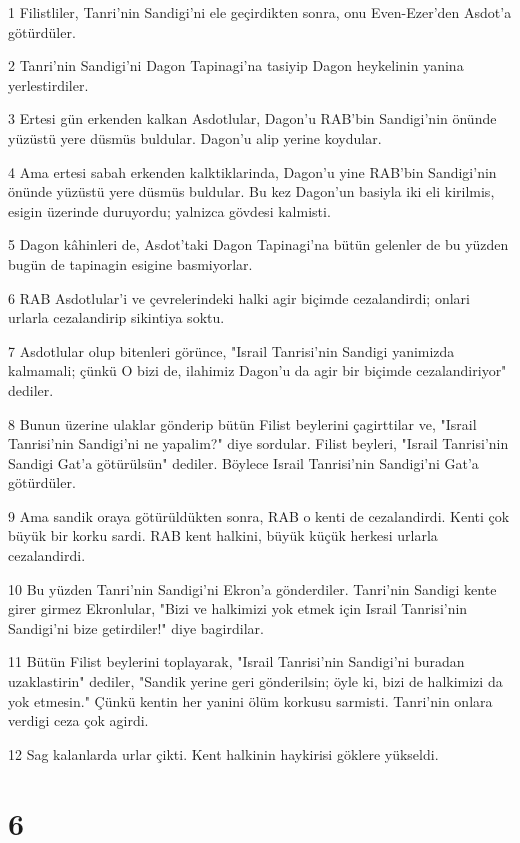 \par 1 Filistliler, Tanri'nin Sandigi'ni ele geçirdikten sonra, onu Even-Ezer'den Asdot'a götürdüler.
\par 2 Tanri'nin Sandigi'ni Dagon Tapinagi'na tasiyip Dagon heykelinin yanina yerlestirdiler.
\par 3 Ertesi gün erkenden kalkan Asdotlular, Dagon'u RAB'bin Sandigi'nin önünde yüzüstü yere düsmüs buldular. Dagon'u alip yerine koydular.
\par 4 Ama ertesi sabah erkenden kalktiklarinda, Dagon'u yine RAB'bin Sandigi'nin önünde yüzüstü yere düsmüs buldular. Bu kez Dagon'un basiyla iki eli kirilmis, esigin üzerinde duruyordu; yalnizca gövdesi kalmisti.
\par 5 Dagon kâhinleri de, Asdot'taki Dagon Tapinagi'na bütün gelenler de bu yüzden bugün de tapinagin esigine basmiyorlar.
\par 6 RAB Asdotlular'i ve çevrelerindeki halki agir biçimde cezalandirdi; onlari urlarla cezalandirip sikintiya soktu.
\par 7 Asdotlular olup bitenleri görünce, "Israil Tanrisi'nin Sandigi yanimizda kalmamali; çünkü O bizi de, ilahimiz Dagon'u da agir bir biçimde cezalandiriyor" dediler.
\par 8 Bunun üzerine ulaklar gönderip bütün Filist beylerini çagirttilar ve, "Israil Tanrisi'nin Sandigi'ni ne yapalim?" diye sordular. Filist beyleri, "Israil Tanrisi'nin Sandigi Gat'a götürülsün" dediler. Böylece Israil Tanrisi'nin Sandigi'ni Gat'a götürdüler.
\par 9 Ama sandik oraya götürüldükten sonra, RAB o kenti de cezalandirdi. Kenti çok büyük bir korku sardi. RAB kent halkini, büyük küçük herkesi urlarla cezalandirdi.
\par 10 Bu yüzden Tanri'nin Sandigi'ni Ekron'a gönderdiler. Tanri'nin Sandigi kente girer girmez Ekronlular, "Bizi ve halkimizi yok etmek için Israil Tanrisi'nin Sandigi'ni bize getirdiler!" diye bagirdilar.
\par 11 Bütün Filist beylerini toplayarak, "Israil Tanrisi'nin Sandigi'ni buradan uzaklastirin" dediler, "Sandik yerine geri gönderilsin; öyle ki, bizi de halkimizi da yok etmesin." Çünkü kentin her yanini ölüm korkusu sarmisti. Tanri'nin onlara verdigi ceza çok agirdi.
\par 12 Sag kalanlarda urlar çikti. Kent halkinin haykirisi göklere yükseldi.

\chapter{6}

